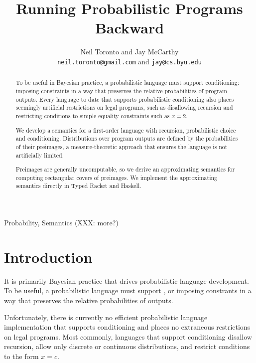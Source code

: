 \documentclass{llncs}
\title{Running Probabilistic Programs Backward}
\author{Neil Toronto and Jay McCarthy\\
\footnotesize{\texttt{neil.toronto@gmail.com} and \texttt{jay@cs.byu.edu}}}
\institute{PLT @ Brigham Young University, Provo, Utah, USA}
\date{}
\begin{document}
\maketitle

\begin{abstract}
To be useful in Bayesian practice, a probabilistic language must support conditioning: imposing constraints in a way that preserves the relative probabilities of program outputs.
Every language to date that supports probabilistic conditioning also places seemingly artificial restrictions on legal programs, such as disallowing recursion and restricting conditions to simple equality constraints such as $x = \mathrm{2}$.

We develop a semantics for a first-order language with recursion, probabilistic choice and conditioning.
Distributions over program outputs are defined by the probabilities of their preimages, a measure-theoretic approach that ensures the language is not artificially limited.

Preimages are generally uncomputable, so we derive an approximating semantics for computing rectangular covers of preimages.
We implement the approximating semantics directly in Typed Racket and Haskell.
\end{abstract}

\keywords Probability, Semantics (XXX: more?)


\section{Introduction}

It is primarily Bayesian practice that drives probabilistic language development.
To be useful, a probabilistic language must support , or imposing constrants in a way that preserves the relative probabilities of outputs.

Unfortunately, there is currently no efficient probabilistic language implementation that supports conditioning and places no extraneous restrictions on legal programs.
Most commonly, languages that support conditioning disallow recursion, allow only discrete or continuous distributions, and restrict conditions to the form $\mathit{x} = \mathit{c}$.
\end{document}
